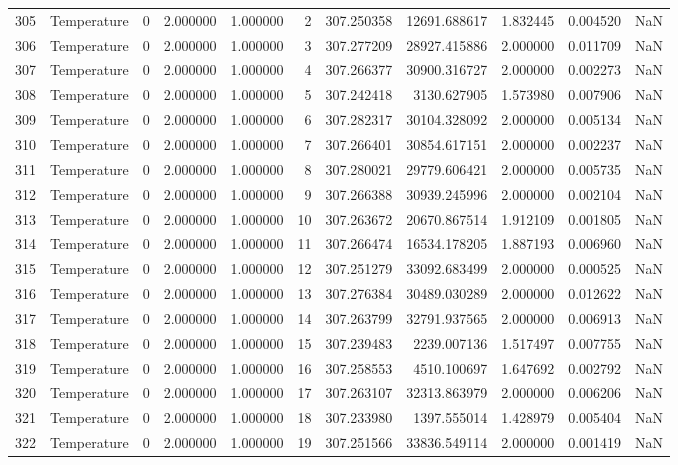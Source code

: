 \begin{tabular}{llrrrrrrrrr}
305 & Temperature & 0 & 2.000000 & 1.000000 & 2 & 307.250358 & 12691.688617 & 1.832445 & 0.004520 & NaN \\
306 & Temperature & 0 & 2.000000 & 1.000000 & 3 & 307.277209 & 28927.415886 & 2.000000 & 0.011709 & NaN \\
307 & Temperature & 0 & 2.000000 & 1.000000 & 4 & 307.266377 & 30900.316727 & 2.000000 & 0.002273 & NaN \\
308 & Temperature & 0 & 2.000000 & 1.000000 & 5 & 307.242418 & 3130.627905 & 1.573980 & 0.007906 & NaN \\
309 & Temperature & 0 & 2.000000 & 1.000000 & 6 & 307.282317 & 30104.328092 & 2.000000 & 0.005134 & NaN \\
310 & Temperature & 0 & 2.000000 & 1.000000 & 7 & 307.266401 & 30854.617151 & 2.000000 & 0.002237 & NaN \\
311 & Temperature & 0 & 2.000000 & 1.000000 & 8 & 307.280021 & 29779.606421 & 2.000000 & 0.005735 & NaN \\
312 & Temperature & 0 & 2.000000 & 1.000000 & 9 & 307.266388 & 30939.245996 & 2.000000 & 0.002104 & NaN \\
313 & Temperature & 0 & 2.000000 & 1.000000 & 10 & 307.263672 & 20670.867514 & 1.912109 & 0.001805 & NaN \\
314 & Temperature & 0 & 2.000000 & 1.000000 & 11 & 307.266474 & 16534.178205 & 1.887193 & 0.006960 & NaN \\
315 & Temperature & 0 & 2.000000 & 1.000000 & 12 & 307.251279 & 33092.683499 & 2.000000 & 0.000525 & NaN \\
316 & Temperature & 0 & 2.000000 & 1.000000 & 13 & 307.276384 & 30489.030289 & 2.000000 & 0.012622 & NaN \\
317 & Temperature & 0 & 2.000000 & 1.000000 & 14 & 307.263799 & 32791.937565 & 2.000000 & 0.006913 & NaN \\
318 & Temperature & 0 & 2.000000 & 1.000000 & 15 & 307.239483 & 2239.007136 & 1.517497 & 0.007755 & NaN \\
319 & Temperature & 0 & 2.000000 & 1.000000 & 16 & 307.258553 & 4510.100697 & 1.647692 & 0.002792 & NaN \\
320 & Temperature & 0 & 2.000000 & 1.000000 & 17 & 307.263107 & 32313.863979 & 2.000000 & 0.006206 & NaN \\
321 & Temperature & 0 & 2.000000 & 1.000000 & 18 & 307.233980 & 1397.555014 & 1.428979 & 0.005404 & NaN \\
322 & Temperature & 0 & 2.000000 & 1.000000 & 19 & 307.251566 & 33836.549114 & 2.000000 & 0.001419 & NaN \\

\end{tabular}
